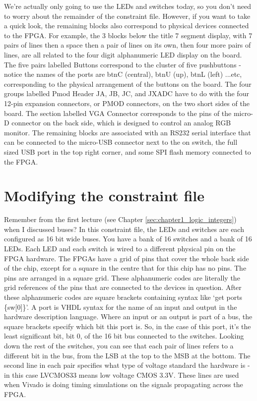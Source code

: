 \documentclass[../physical_computing.tex]{subfiles}
\begin{document}
We're actually only going to use the LEDs and switches today, so you don't need to worry about the remainder of the constraint file. However, if you want to take a quick look, the remaining blocks also correspond to physical devices connected to the FPGA. For example, the 3 blocks below the title 7 segment display, with 7 pairs of lines then a space then a pair of lines on its own, then four more pairs of lines, are all related to the four digit alphanumeric LED display on the board. The five pairs labelled Buttons correspond to the cluster of five pushbuttons - notice the names of the ports are btnC (central), btnU (up), btnL (left) ...etc, corresponding to the physical arrangement of the buttons on the board. The four groups labelled Pmod Header JA, JB, JC, and JXADC have to do with the four 12-pin expansion connectors, or PMOD connectors, on the two short sides of the board. The section labelled VGA Connector corresponds to the pins of the micro-D connector on the back side, which is designed to control an analog RGB monitor. The remaining blocks are associated with an RS232 serial interface that can be connected to the micro-USB connector next to the on switch, the full sized USB port in the top right corner, and some SPI flash memory connected to the FPGA.

\section{Modifying the constraint file}
\label{sec:constraints}

Remember from the first lecture (see Chapter \ref{sec:chapter1_logic_integers}) when I discussed buses? In this constraint file, the LEDs and switches are each configured as 16 bit wide buses. You have a bank of 16 switches and a bank of 16 LEDs. Each LED and each switch is wired to a different physical pin on the FPGA hardware. The FPGAs have a grid of pins that cover the whole back side of the chip, except for a square in the centre that for this chip has no pins. The pins are arranged in a square grid. These alphanumeric codes are literally the grid references of the pins that are connected to the devices in question. After these alphanumeric codes are square brackets containing syntax like `get ports \{sw[0]\}'. A port is VHDL syntax for the name of an input and output in the hardware description language. Where an input or an output is part of a bus, the square brackets specify which bit this port is. So, in the case of this port, it's the least significant bit, bit 0, of the 16 bit bus connected to the switches. Looking down the rest of the switches, you can see that each pair of lines refers to a different bit in the bus, from the LSB at the top to the MSB at the bottom. The second line in each pair specifies what type of voltage standard the hardware is - in this case LVCMOS33 means low voltage CMOS 3.3V. These lines are used when Vivado is doing timing simulations on the signals propagating across the FPGA. 
\end{document}
